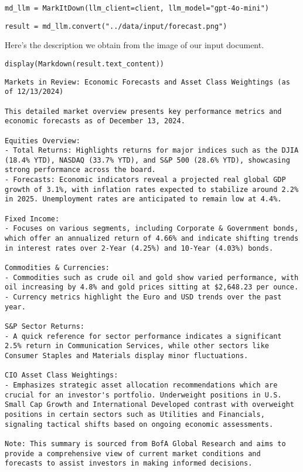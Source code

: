 \begin{verbatim}
md_llm = MarkItDown(llm_client=client, llm_model="gpt-4o-mini")
\end{verbatim}

\begin{verbatim}
result = md_llm.convert("../data/input/forecast.png")
\end{verbatim}

Here's the description we obtain from the image of our input document.

\begin{verbatim}
display(Markdown(result.text_content))
\end{verbatim}

\begin{verbatim}
Markets in Review: Economic Forecasts and Asset Class Weightings (as of 12/13/2024)

This detailed market overview presents key performance metrics and economic forecasts as of December 13, 2024.

Equities Overview:
- Total Returns: Highlights returns for major indices such as the DJIA (18.4% YTD), NASDAQ (33.7% YTD), and S&P 500 (28.6% YTD), showcasing strong performance across the board.
- Forecasts: Economic indicators reveal a projected real global GDP growth of 3.1%, with inflation rates expected to stabilize around 2.2% in 2025. Unemployment rates are anticipated to remain low at 4.4%.

Fixed Income:
- Focuses on various segments, including Corporate & Government bonds, which offer an annualized return of 4.66% and indicate shifting trends in interest rates over 2-Year (4.25%) and 10-Year (4.03%) bonds.

Commodities & Currencies:
- Commodities such as crude oil and gold show varied performance, with oil increasing by 4.8% and gold prices sitting at $2,648.23 per ounce.
- Currency metrics highlight the Euro and USD trends over the past year.

S&P Sector Returns:
- A quick reference for sector performance indicates a significant 2.5% return in Communication Services, while other sectors like Consumer Staples and Materials display minor fluctuations.

CIO Asset Class Weightings:
- Emphasizes strategic asset allocation recommendations which are crucial for an investor's portfolio. Underweight positions in U.S. Small Cap Growth and International Developed contrast with overweight positions in certain sectors such as Utilities and Financials, signaling tactical shifts based on ongoing economic assessments.

Note: This summary is sourced from BofA Global Research and aims to provide a comprehensive view of current market conditions and forecasts to assist investors in making informed decisions.
\end{verbatim}

